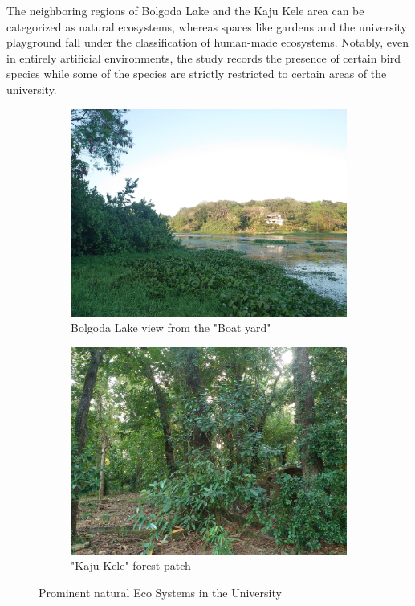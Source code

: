 The neighboring regions of Bolgoda Lake and the Kaju Kele area can be categorized as natural ecosystems, whereas spaces like gardens and the university playground fall under the classification of human-made ecosystems. Notably, even in entirely artificial environments, the study records the presence of certain bird species while some of the species are strictly restricted to certain areas of the university.

\begin{figure}[!htpb]
    \centering
    \begin{subfigure}{0.45\textwidth}
        \includegraphics[width=\textwidth]{Figures/bolgoda.jpg}
        \caption{Bolgoda Lake view from the "Boat yard"}
        \label{fig:figure-02.1}
    \end{subfigure}
    \hspace{.5cm} %
    \begin{subfigure}{0.45\textwidth}
        \includegraphics[width=\textwidth]{Figures/kajuKele.jpg}
        \caption{"Kaju Kele" forest patch}
        \label{fig:figure-02.2}
    \end{subfigure}
    \caption{Prominent natural Eco Systems in the University}
    \label{fig:figure-02}
\end{figure}

